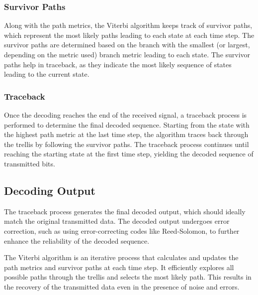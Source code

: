 \subsubsection{Survivor Paths}
Along with the path metrics, the Viterbi algorithm keeps track of survivor paths, which represent the most likely paths leading to each state at each time step.
The survivor paths are determined based on the branch with the smallest (or largest, depending on the metric used) branch metric leading to each state.
The survivor paths help in traceback, as they indicate the most likely sequence of states leading to the current state.

\subsubsection{Traceback}
Once the decoding reaches the end of the received signal, a traceback process is performed to determine the final decoded sequence.
Starting from the state with the highest path metric at the last time step, the algorithm traces back through the trellis by following the survivor paths.
The traceback process continues until reaching the starting state at the first time step, yielding the decoded sequence of transmitted bits.

\subsection{Decoding Output}
The traceback process generates the final decoded output, which should ideally match the original transmitted data.
The decoded output undergoes error correction, such as using error-correcting codes like Reed-Solomon, to further enhance the reliability of the decoded sequence.

\noindent The Viterbi algorithm is an iterative process that calculates and updates the path metrics and survivor paths at each time step. It efficiently explores all possible paths through the trellis and selects the most likely path. This results in the recovery of the transmitted data even in the presence of noise and errors.

